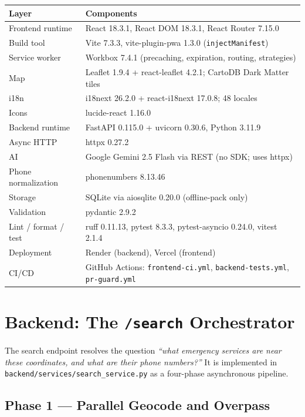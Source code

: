 \documentclass[11pt, a4paper]{article}
\newcommand{\file}[1]{\texttt{\small\color{rsblue}#1}}
\newcommand{\code}[1]{\texttt{\small#1}}
\begin{document}
\begin{tabularx}{\textwidth}{l X}
\toprule
\textbf{Layer} & \textbf{Components} \\
\midrule
Frontend runtime & React 18.3.1, React DOM 18.3.1, React Router 7.15.0 \\
Build tool & Vite 7.3.3, vite-plugin-pwa 1.3.0 (\code{injectManifest}) \\
Service worker & Workbox 7.4.1 (precaching, expiration, routing, strategies) \\
Map & Leaflet 1.9.4 + react-leaflet 4.2.1; CartoDB Dark Matter tiles \\
i18n & i18next 26.2.0 + react-i18next 17.0.8; 48 locales \\
Icons & lucide-react 1.16.0 \\
Backend runtime & FastAPI 0.115.0 + uvicorn 0.30.6, Python 3.11.9 \\
Async HTTP & httpx 0.27.2 \\
AI & Google Gemini 2.5 Flash via REST (no SDK; uses httpx) \\
Phone normalization & phonenumbers 8.13.46 \\
Storage & SQLite via aiosqlite 0.20.0 (offline-pack only) \\
Validation & pydantic 2.9.2 \\
Lint / format / test & ruff 0.11.13, pytest 8.3.3, pytest-asyncio 0.24.0, vitest 2.1.4 \\
Deployment & Render (backend), Vercel (frontend) \\
CI/CD & GitHub Actions: \code{frontend-ci.yml}, \code{backend-tests.yml}, \code{pr-guard.yml} \\
\bottomrule
\end{tabularx}

\section{Backend: The \texttt{/search} Orchestrator}

The search endpoint resolves the question \emph{``what emergency services are near these coordinates, and what are their phone numbers?''} It is implemented in \file{backend/services/search\_service.py} as a four-phase asynchronous pipeline.

\subsection{Phase 1 --- Parallel Geocode and Overpass}
\end{document}
